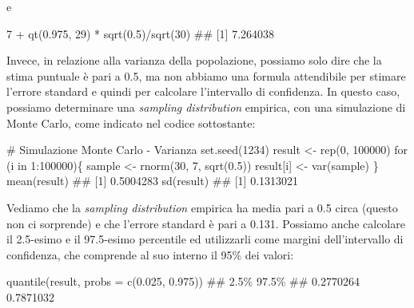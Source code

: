 \documentclass[a4paper,12pt,oneside]{book}
\newenvironment{Shaded}{\begin{snugshade}}{\end{snugshade}}
\newcommand{\DecValTok}[1]{#1}
\newcommand{\FloatTok}[1]{#1}
\newcommand{\SpecialCharTok}[1]{#1}
\newcommand{\CommentTok}[1]{#1}
\newcommand{\DocumentationTok}[1]{#1}
\newcommand{\OtherTok}[1]{#1}
\newcommand{\FunctionTok}[1]{#1}
\newcommand{\ControlFlowTok}[1]{#1}
\newcommand{\AttributeTok}[1]{#1}
\newcommand{\NormalTok}[1]{#1}
\begin{document}
e

\begin{Shaded}
\begin{Highlighting}[]
\DecValTok{7} \SpecialCharTok{+} \FunctionTok{qt}\NormalTok{(}\FloatTok{0.975}\NormalTok{, }\DecValTok{29}\NormalTok{) }\SpecialCharTok{*} \FunctionTok{sqrt}\NormalTok{(}\FloatTok{0.5}\NormalTok{)}\SpecialCharTok{/}\FunctionTok{sqrt}\NormalTok{(}\DecValTok{30}\NormalTok{)}
\DocumentationTok{\#\# [1] 7.264038}
\end{Highlighting}
\end{Shaded}

Invece, in relazione alla varianza della popolazione, possiamo solo dire che la stima puntuale è pari a 0.5, ma non abbiamo una formula attendibile per stimare l'errore standard e quindi per calcolare l'intervallo di confidenza. In questo caso, possiamo determinare una \emph{sampling distribution} empirica, con una simulazione di Monte Carlo, come indicato nel codice sottostante:

\begin{Shaded}
\begin{Highlighting}[]
\CommentTok{\# Simulazione Monte Carlo {-} Varianza}
\FunctionTok{set.seed}\NormalTok{(}\DecValTok{1234}\NormalTok{)}
\NormalTok{result }\OtherTok{\textless{}{-}} \FunctionTok{rep}\NormalTok{(}\DecValTok{0}\NormalTok{, }\DecValTok{100000}\NormalTok{)}
\ControlFlowTok{for}\NormalTok{ (i }\ControlFlowTok{in} \DecValTok{1}\SpecialCharTok{:}\DecValTok{100000}\NormalTok{)\{}
\NormalTok{  sample }\OtherTok{\textless{}{-}} \FunctionTok{rnorm}\NormalTok{(}\DecValTok{30}\NormalTok{, }\DecValTok{7}\NormalTok{, }\FunctionTok{sqrt}\NormalTok{(}\FloatTok{0.5}\NormalTok{))}
\NormalTok{  result[i] }\OtherTok{\textless{}{-}} \FunctionTok{var}\NormalTok{(sample)}
\NormalTok{\}}
\FunctionTok{mean}\NormalTok{(result)}
\DocumentationTok{\#\# [1] 0.5004283}
\FunctionTok{sd}\NormalTok{(result)}
\DocumentationTok{\#\# [1] 0.1313021}
\end{Highlighting}
\end{Shaded}

Vediamo che la \emph{sampling distribution} empirica ha media pari a 0.5 circa (questo non ci sorprende) e che l'errore standard è pari a 0.131. Possiamo anche calcolare il 2.5-esimo e il 97.5-esimo percentile ed utilizzarli come margini dell'intervallo di confidenza, che comprende al suo interno il 95\% dei valori:

\begin{Shaded}
\begin{Highlighting}[]
\FunctionTok{quantile}\NormalTok{(result, }\AttributeTok{probs =} \FunctionTok{c}\NormalTok{(}\FloatTok{0.025}\NormalTok{, }\FloatTok{0.975}\NormalTok{))}
\DocumentationTok{\#\#      2.5\%     97.5\% }
\DocumentationTok{\#\# 0.2770264 0.7871032}
\end{Highlighting}
\end{Shaded}
\end{document}
